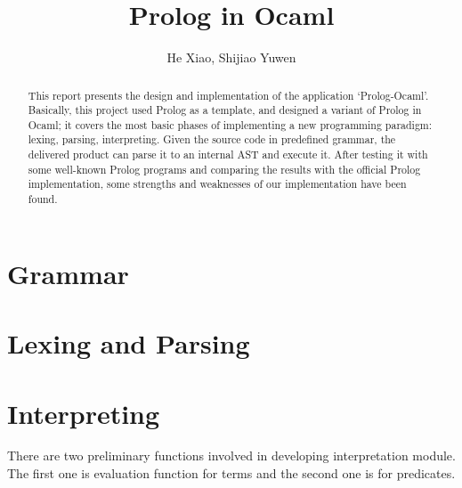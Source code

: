 \documentclass[11pt,a4paper]{report}
\author{He Xiao, Shijiao Yuwen}
\title{Prolog in Ocaml}
\begin{document}
	\maketitle
	
\begin{abstract}
	This report presents the design and implementation of the application `Prolog-Ocaml'.
	Basically, this project used Prolog \cite{PrologWiki} as a template, and designed a variant of Prolog in Ocaml;
	it covers the most basic phases of implementing a new programming paradigm: lexing, parsing, interpreting.
	Given the source code in predefined grammar, the delivered product can parse it to an internal AST and execute
	it. After testing it with some well-known Prolog programs and comparing the results with the official Prolog implementation,
	some strengths and weaknesses of our implementation have been found.  
\end{abstract}

\section*{Grammar}


\section*{Lexing and Parsing}


\section*{Interpreting}
There are two preliminary functions involved in developing interpretation module. The first one is evaluation function for terms and the second one is for predicates.\\
\end{document}

